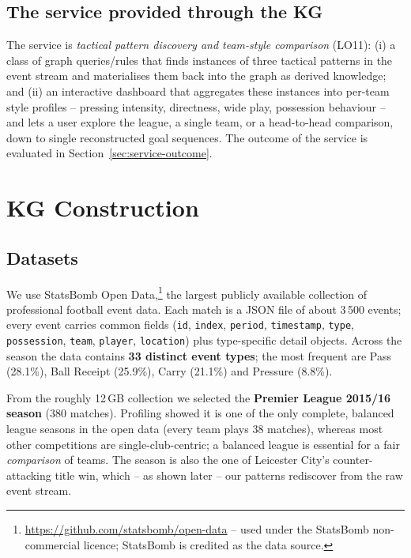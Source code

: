 \documentclass[11pt,a4paper]{article}
\begin{document}
\subsection{The service provided through the KG}

The service is \emph{tactical pattern discovery and team-style comparison}
(LO11): (i) a class of graph queries/rules that finds instances of three
tactical patterns in the event stream and materialises them back into the graph
as derived knowledge; and (ii) an interactive dashboard that aggregates these
instances into per-team style profiles -- pressing intensity, directness, wide
play, possession behaviour -- and lets a user explore the league, a single team,
or a head-to-head comparison, down to single reconstructed goal sequences. The
outcome of the service is evaluated in Section~\ref{sec:service-outcome}.

\section{KG Construction}

\subsection{Datasets}

We use StatsBomb Open Data,\footnote{\url{https://github.com/statsbomb/open-data}
-- used under the StatsBomb non-commercial licence; StatsBomb is credited as the
data source.} the largest publicly available collection of professional football
event data. Each match is a JSON file of about 3\,500 events; every event carries
common fields (\texttt{id}, \texttt{index}, \texttt{period}, \texttt{timestamp},
\texttt{type}, \texttt{possession}, \texttt{team}, \texttt{player},
\texttt{location}) plus type-specific detail objects. Across the season the data
contains \textbf{33 distinct event types}; the most frequent are Pass (28.1\%),
Ball Receipt (25.9\%), Carry (21.1\%) and Pressure (8.8\%).

From the roughly 12\,GB collection we selected the \textbf{Premier League
2015/16 season} (380 matches). Profiling showed it is one of the only complete,
balanced league seasons in the open data (every team plays 38 matches), whereas
most other competitions are single-club-centric; a balanced league is essential
for a fair \emph{comparison} of teams. The season is also the one of Leicester
City's counter-attacking title win, which -- as shown later -- our patterns
rediscover from the raw event stream.
\end{document}
